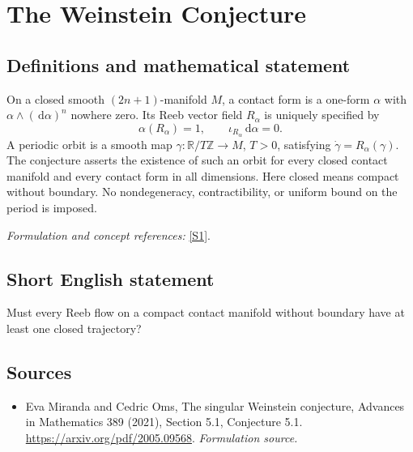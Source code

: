 \documentclass[11pt]{article}
\begin{document}
\section*{\texorpdfstring{The Weinstein Conjecture}{The Weinstein Conjecture}}\label{statement}
\subsection{Definitions and mathematical statement}
On a closed smooth $(2n+1)$-manifold $M$, a contact form is a one-form $\alpha$ with $\alpha\wedge({\,\mathrm{d}}\alpha)^n$ nowhere zero. Its Reeb vector field $R_\alpha$ is uniquely specified by
\[
 \alpha(R_\alpha)=1,\qquad \iota_{R_\alpha}{\,\mathrm{d}}\alpha=0.
\]
A periodic orbit is a smooth map $\gamma:{\mathbb{R}}/T{\mathbb{Z}}\to M$, $T>0$, satisfying $\dot\gamma=R_\alpha(\gamma)$. The conjecture asserts the existence of such an orbit for every closed contact manifold and every contact form in all dimensions. Here closed means compact without boundary. No nondegeneracy, contractibility, or uniform bound on the period is imposed.
\par\smallskip\textit{Formulation and concept references:} \href{https://arxiv.org/pdf/2005.09568}{[S1]}.

\subsection{Short English statement}
Must every Reeb flow on a compact contact manifold without boundary have at least one closed trajectory?
\subsection{Sources}
\begin{itemize}
\item[S1]Eva Miranda and Cedric Oms, The singular Weinstein conjecture, Advances in Mathematics 389 (2021), Section 5.1, Conjecture 5.1.
\url{https://arxiv.org/pdf/2005.09568}.
\textit{Formulation source.}
\end{itemize}
\end{document}
